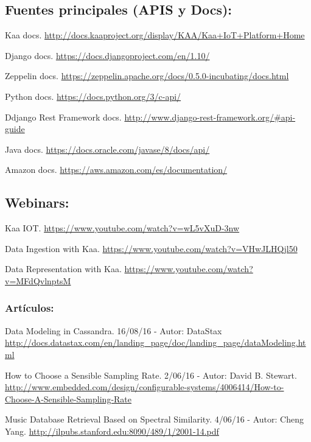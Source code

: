 
\subsection*{Fuentes principales (APIS y Docs):}

 Kaa docs. \url{http://docs.kaaproject.org/display/KAA/Kaa+IoT+Platform+Home}

 Django docs. \url{https://docs.djangoproject.com/en/1.10/}

 Zeppelin docs. \url{https://zeppelin.apache.org/docs/0.5.0-incubating/docs.html}

 Python docs. \url{https://docs.python.org/3/c-api/}

 Ddjango Rest Framework docs. \url{http://www.django-rest-framework.org/#api-guide}

 Java docs. \url{https://docs.oracle.com/javase/8/docs/api/}

 Amazon docs. \url{https://aws.amazon.com/es/documentation/}



\subsection*{Webinars:}

 Kaa IOT. \url{https://www.youtube.com/watch?v=wL5vXuD-3nw}

 Data Ingestion with Kaa. \url{https://www.youtube.com/watch?v=VHwJLHQjl50}

 Data Representation with Kaa. \url{https://www.youtube.com/watch?v=MFdQvlnptsM}


\subsubsection*{Artículos:}

 Data Modeling in Cassandra. 16/08/16 - Autor: DataStax \url{http://docs.datastax.com/en/landing_page/doc/landing_page/dataModeling.html}

 How to Choose a Sensible Sampling Rate. 2/06/16 - Autor: David B. Stewart. \url{http://www.embedded.com/design/configurable-systems/4006414/How-to-Choose-A-Sensible-Sampling-Rate}

 Music Database Retrieval Based on Spectral Similarity. 4/06/16 - Autor: Cheng Yang. \url{http://ilpubs.stanford.edu:8090/489/1/2001-14.pdf}

